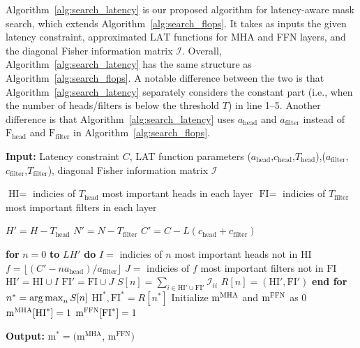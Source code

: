 Algorithm~\ref{alg:search_latency} is our proposed algorithm for latency-aware mask search, which extends Algorithm~\ref{alg:search_flops}.
It takes as inputs the given latency constraint, approximated $\text{LAT}$ functions for MHA and FFN layers, and the diagonal Fisher information matrix $\mathcal{I}$.
Overall, Algorithm~\ref{alg:search_latency} has the same structure as Algorithm~\ref{alg:search_flops}.
A notable difference between the two is that Algorithm~\ref{alg:search_latency} separately considers the constant part (i.e., when the number of heads/filters is below the threshold $T$) in line 1--5.
Another difference is that Algorithm~\ref{alg:search_latency} uses $a_\text{head}$ and $a_\text{filter}$ instead of $\text{F}_\text{head}$ and $\text{F}_\text{filter}$ in Algorithm~\ref{alg:search_flops}.


\begin{algorithm}[tb]
   \caption{Mask Search with a Latency Constraint}
   \label{alg:search_latency}
   
\footnotesize
    {\bfseries Input:} Latency constraint $C$, LAT function parameters ($a_{\text{head}}$,$c_{\text{head}}$,$T_{\text{head}}$),($a_{\text{filter}}$,$c_{\text{filter}}$,$T_{\text{filter}}$), diagonal Fisher information matrix $\mathcal{I}$

\begin{algorithmic}[1]
    \STATE $\text{HI} = $ indicies of $T_\text{head}$ most important heads in each layer
    \STATE $\text{FI} = $ indicies of $T_\text{filter}$ most important filters in each layer

    \STATE $H' = H - T_\text{head}$
    \STATE $N' = N - T_\text{filter}$
    \STATE $C' = C - L (c_\text{head} + c_\text{filter})$

    \STATE \textbf{for} {$n=0$ {\bfseries to} $LH'$} \textbf{do}
        \STATE \quad $I = $ indicies of $n$ most important heads not in $\text{HI}$
        \STATE \quad $f = \lfloor (C' - n a_{\text{head}}) / a_\text{filter} \rfloor $
        \STATE \quad $J = $ indicies of $f$ most important filters not in $\text{FI}$
        \STATE \quad $\text{HI}' = \text{HI} \cup I$
        \STATE \quad $\text{FI}' = \text{FI} \cup J$
        \STATE \quad $S[n] = \sum_{i \in \text{HI}' \cup \text{FI}'} \mathcal{I}_{ii}$
        \STATE \quad $R[n] = (\text{HI}', \text{FI}')$
    \STATE \textbf{end for}
    \STATE $n^\ast = \operatorname*{arg\,max}_n S[n]$
    \STATE $\text{HI}^\ast, \text{FI}^\ast = R[n^\ast]$
    \STATE Initialize $\text{m}^{\textsc{MHA}}$ and $\text{m}^{\textsc{FFN}}$ as 0
    \STATE $\text{m}^{\textsc{MHA}}[\text{HI}^\ast] = 1$
    \STATE $\text{m}^{\textsc{FFN}}[\text{FI}^\ast] = 1$ 
\end{algorithmic}

     {\bfseries Output:} $\text{m}^\ast = (\text{m}^{\textrm{MHA}}$, $\text{m}^{\textrm{FFN}})$

\end{algorithm}



